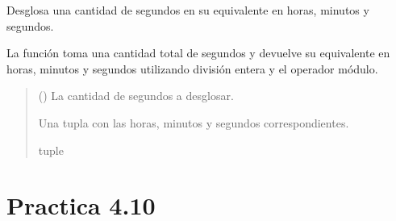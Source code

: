 \documentclass[letterpaper,10pt,spanish]{sphinxmanual}
\begin{document}
\begin{fulllineitems}
\label{\detokenize{pr4:pr4.9.desglosar_segundos}}
\pysigstartsignatures
{}
\pysigstopsignatures
\sphinxAtStartPar
Desglosa una cantidad de segundos en su equivalente en horas, minutos y segundos.

\sphinxAtStartPar
La función toma una cantidad total de segundos y devuelve su equivalente en
horas, minutos y segundos utilizando división entera y el operador módulo.
\begin{quote}\begin{description}
\sphinxAtStartPar
{} () \textendash{} La cantidad de segundos a desglosar.

\sphinxAtStartPar
Una tupla con las horas, minutos y segundos correspondientes.

\sphinxAtStartPar
tuple

\end{description}\end{quote}

\end{fulllineitems}



\section{Practica 4.10}
\label{\detokenize{pr4:module-pr4.10}}\label{\detokenize{pr4:practica-4-10}}
\end{document}
